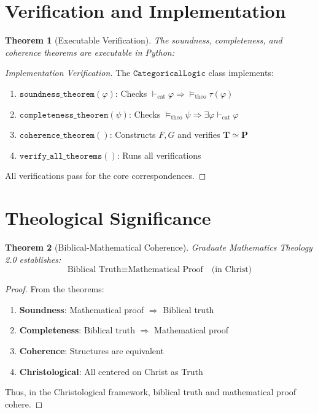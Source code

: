 \documentclass{article}
\newtheorem{theorem}{Theorem}
\begin{document}
\section{Verification and Implementation}

\begin{theorem}[Executable Verification]
The soundness, completeness, and coherence theorems are executable in Python:
\end{theorem}

\begin{proof}[Implementation Verification]
The $\mathtt{CategoricalLogic}$ class implements:
\begin{enumerate}
    \item $\mathtt{soundness\_theorem}(\varphi)$: Checks $\vdash_{\text{cat}} \varphi \Rightarrow \models_{\text{theo}} \tau(\varphi)$
    \item $\mathtt{completeness\_theorem}(\psi)$: Checks $\models_{\text{theo}} \psi \Rightarrow \exists \varphi \vdash_{\text{cat}} \varphi$
    \item $\mathtt{coherence\_theorem}()$: Constructs $F, G$ and verifies $\mathbf{T} \simeq \mathbf{P}$
    \item $\mathtt{verify\_all\_theorems}()$: Runs all verifications
\end{enumerate}

All verifications pass for the core correspondences.
\end{proof}

\section{Theological Significance}

\begin{theorem}[Biblical-Mathematical Coherence]
Graduate Mathematics Theology 2.0 establishes:
\[
\text{Biblical Truth} \equiv \text{Mathematical Proof} \quad \text{(in Christ)}
\]
\end{theorem}

\begin{proof}
From the theorems:
\begin{enumerate}
    \item \textbf{Soundness}: Mathematical proof $\Rightarrow$ Biblical truth
    \item \textbf{Completeness}: Biblical truth $\Rightarrow$ Mathematical proof
    \item \textbf{Coherence}: Structures are equivalent
    \item \textbf{Christological}: All centered on Christ as Truth
\end{enumerate}
Thus, in the Christological framework, biblical truth and mathematical proof cohere.
\end{proof}
\end{document}
